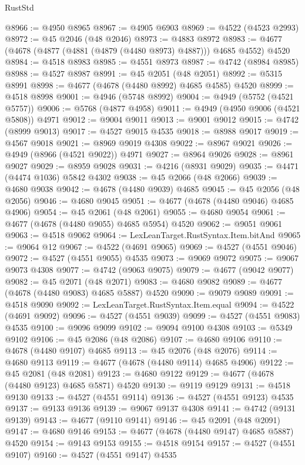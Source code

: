 \begin{lexlean}{RustStd}
\begin{coremodule}
@8966 := @4950 @8965
@8967 := @4905 @6903
@8969 := @4522 (@4523 @2993)
@8972 := @45 @2046 (@48 @2046)
@8973 := @4883 @8972
@8983 := @4677 (@4678 (@4877 (@4881 (@4879 (@4480 @8973) @4887))) @4685 @4552) @4520
@8984 := @4518 @8983
@8985 := @4551 @8973
@8987 := @4742 (@8984 @8985)
@8988 := @4527 @8987
@8991 := @45 @2051 (@48 @2051)
@8992 := @5315 @8991
@8998 := @4677 (@4678 (@4480 @8992) @4685 @4585) @4520
@8999 := @4518 @8998
@9001 := @4946 (@5748 @8992)
@9004 := @4949 (@5752 (@4521 @5757))
@9006 := @5768 (@4877 @4958)
@9011 := @4949 (@4950 @9006 (@4521 @5808)) @4971
@9012 := @9004 @9011
@9013 := @9001 @9012
@9015 := @4742 (@8999 @9013)
@9017 := @4527 @9015 @4535
@9018 := @8988 @9017
@9019 := @4567 @9018
@9021 := @8969 @9019 @4308
@9022 := @8967 @9021
@9026 := @4949 (@8966 (@4521 @9022)) @4971
@9027 := @8964 @9026
@9028 := @8961 @9027
@9029 := @8959 @9028
@9031 := @4216 (@8931 @9029)
@9035 := @4471 (@4474 @1036) @5842 @4302
@9038 := @45 @2066 (@48 @2066)
@9039 := @4680 @9038
@9042 := @4678 (@4480 @9039) @4685
@9045 := @45 @2056 (@48 @2056)
@9046 := @4680 @9045
@9051 := @4677 (@4678 (@4480 @9046) @4685 @4906)
@9054 := @45 @2061 (@48 @2061)
@9055 := @4680 @9054
@9061 := @4677 (@4678 (@4480 @9055) @4685 @5954) @4520
@9062 := @9051 @9061
@9063 := @4518 @9062
@9064 := LexLeanTarget.RustSyntax.Item.bitAnd
@9065 := @9064 @12
@9067 := @4522 (@4691 @9065)
@9069 := @4527 (@4551 @9046)
@9072 := @4527 (@4551 @9055) @4535
@9073 := @9069 @9072
@9075 := @9067 @9073 @4308
@9077 := @4742 (@9063 @9075)
@9079 := @4677 (@9042 @9077)
@9082 := @45 @2071 (@48 @2071)
@9083 := @4680 @9082
@9089 := @4677 (@4678 (@4480 @9083) @4685 @5887) @4520
@9090 := @9079 @9089
@9091 := @4518 @9090
@9092 := LexLeanTarget.RustSyntax.Item.equal
@9094 := @4522 (@4691 @9092)
@9096 := @4527 (@4551 @9039)
@9099 := @4527 (@4551 @9083) @4535
@9100 := @9096 @9099
@9102 := @9094 @9100 @4308
@9103 := @5349 @9102
@9106 := @45 @2086 (@48 @2086)
@9107 := @4680 @9106
@9110 := @4678 (@4480 @9107) @4685
@9113 := @45 @2076 (@48 @2076)
@9114 := @4680 @9113
@9119 := @4677 (@4678 (@4480 @9114) @4685 @4906)
@9122 := @45 @2081 (@48 @2081)
@9123 := @4680 @9122
@9129 := @4677 (@4678 (@4480 @9123) @4685 @5871) @4520
@9130 := @9119 @9129
@9131 := @4518 @9130
@9133 := @4527 (@4551 @9114)
@9136 := @4527 (@4551 @9123) @4535
@9137 := @9133 @9136
@9139 := @9067 @9137 @4308
@9141 := @4742 (@9131 @9139)
@9143 := @4677 (@9110 @9141)
@9146 := @45 @2091 (@48 @2091)
@9147 := @4680 @9146
@9153 := @4677 (@4678 (@4480 @9147) @4685 @5887) @4520
@9154 := @9143 @9153
@9155 := @4518 @9154
@9157 := @4527 (@4551 @9107)
@9160 := @4527 (@4551 @9147) @4535

\end{coremodule}
\end{lexlean}
